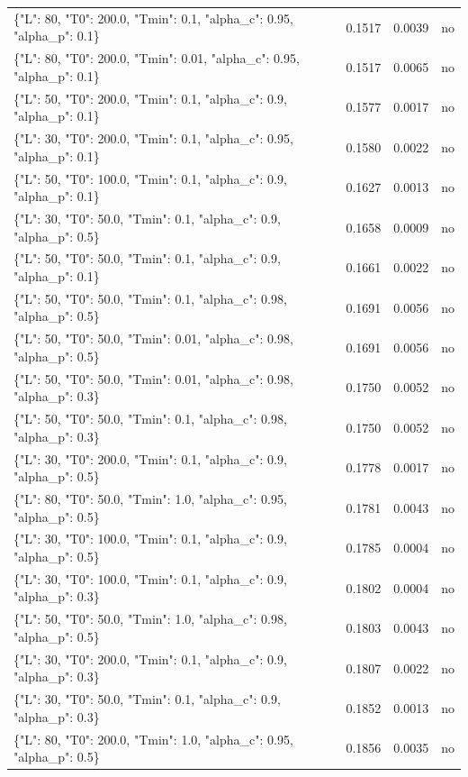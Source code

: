 \begin{table}[htbp]
\begin{tabular}{lrrr}
\{"L": 80, "T0": 200.0, "Tmin": 0.1, "alpha\_c": 0.95, "alpha\_p": 0.1\} & 0.1517 & 0.0039 & no \\
\{"L": 80, "T0": 200.0, "Tmin": 0.01, "alpha\_c": 0.95, "alpha\_p": 0.1\} & 0.1517 & 0.0065 & no \\
\{"L": 50, "T0": 200.0, "Tmin": 0.1, "alpha\_c": 0.9, "alpha\_p": 0.1\} & 0.1577 & 0.0017 & no \\
\{"L": 30, "T0": 200.0, "Tmin": 0.1, "alpha\_c": 0.95, "alpha\_p": 0.1\} & 0.1580 & 0.0022 & no \\
\{"L": 50, "T0": 100.0, "Tmin": 0.1, "alpha\_c": 0.9, "alpha\_p": 0.1\} & 0.1627 & 0.0013 & no \\
\{"L": 30, "T0": 50.0, "Tmin": 0.1, "alpha\_c": 0.9, "alpha\_p": 0.5\} & 0.1658 & 0.0009 & no \\
\{"L": 50, "T0": 50.0, "Tmin": 0.1, "alpha\_c": 0.9, "alpha\_p": 0.1\} & 0.1661 & 0.0022 & no \\
\{"L": 50, "T0": 50.0, "Tmin": 0.1, "alpha\_c": 0.98, "alpha\_p": 0.5\} & 0.1691 & 0.0056 & no \\
\{"L": 50, "T0": 50.0, "Tmin": 0.01, "alpha\_c": 0.98, "alpha\_p": 0.5\} & 0.1691 & 0.0056 & no \\
\{"L": 50, "T0": 50.0, "Tmin": 0.01, "alpha\_c": 0.98, "alpha\_p": 0.3\} & 0.1750 & 0.0052 & no \\
\{"L": 50, "T0": 50.0, "Tmin": 0.1, "alpha\_c": 0.98, "alpha\_p": 0.3\} & 0.1750 & 0.0052 & no \\
\{"L": 30, "T0": 200.0, "Tmin": 0.1, "alpha\_c": 0.9, "alpha\_p": 0.5\} & 0.1778 & 0.0017 & no \\
\{"L": 80, "T0": 50.0, "Tmin": 1.0, "alpha\_c": 0.95, "alpha\_p": 0.5\} & 0.1781 & 0.0043 & no \\
\{"L": 30, "T0": 100.0, "Tmin": 0.1, "alpha\_c": 0.9, "alpha\_p": 0.5\} & 0.1785 & 0.0004 & no \\
\{"L": 30, "T0": 100.0, "Tmin": 0.1, "alpha\_c": 0.9, "alpha\_p": 0.3\} & 0.1802 & 0.0004 & no \\
\{"L": 50, "T0": 50.0, "Tmin": 1.0, "alpha\_c": 0.98, "alpha\_p": 0.5\} & 0.1803 & 0.0043 & no \\
\{"L": 30, "T0": 200.0, "Tmin": 0.1, "alpha\_c": 0.9, "alpha\_p": 0.3\} & 0.1807 & 0.0022 & no \\
\{"L": 30, "T0": 50.0, "Tmin": 0.1, "alpha\_c": 0.9, "alpha\_p": 0.3\} & 0.1852 & 0.0013 & no \\
\{"L": 80, "T0": 200.0, "Tmin": 1.0, "alpha\_c": 0.95, "alpha\_p": 0.5\} & 0.1856 & 0.0035 & no \\

\end{tabular}
\end{table}
